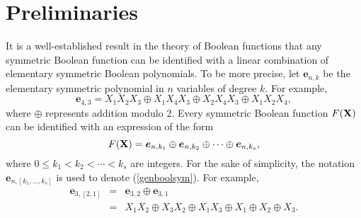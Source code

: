 \section{Preliminaries}
It is a well-established result in the theory of Boolean functions that any symmetric Boolean function can be identified with a linear combination of elementary symmetric Boolean polynomials.
To be more precise, let $\boldsymbol{e}_{n,k}$ be the elementary symmetric polynomial in $n$ variables of degree $k$. For example,
\begin{equation*}
\boldsymbol{e}_{4,3} = X_1 X_2 X_3\oplus X_1 X_4 X_3\oplus X_2 X_4 X_3\oplus X_1 X_2 X_4,
\end{equation*}
where $\oplus$ represents addition modulo 2.  Every symmetric Boolean function $F({\bf X})$ can be identified with an expression of the form
\begin{equation}
\label{genboolsym}
F({\bf X})=\boldsymbol{e}_{n,k_1}\oplus \boldsymbol{e}_{n,k_2}\oplus \cdots\oplus \boldsymbol{e}_{n,k_s},
\end{equation}
where $0\leq k_1<k_2<\cdots<k_s$ are integers.  For the sake of simplicity, the notation $\boldsymbol{e}_{n,[k_1,\ldots,k_s]}$ is used to denote (\ref{genboolsym}).  For example,
\begin{eqnarray}
\boldsymbol{e}_{3,[2,1]}&=&\boldsymbol{e}_{3,2}\oplus \boldsymbol{e}_{3,1}\\ \nonumber
&=& X_1 X_2\oplus X_3 X_2\oplus X_1 X_3\oplus X_1\oplus X_2\oplus X_3.
\end{eqnarray}

